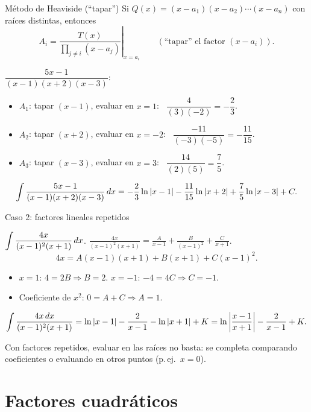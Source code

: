 \documentclass[10pt,aspectratio=169]{beamer}
\begin{document}
\begin{frame}{Método de Heaviside (``tapar'')}
  Si $Q(x)=(x-a_1)(x-a_2)\cdots(x-a_n)$ con raíces distintas, entonces
  \[ A_i=\left.\frac{T(x)}{\prod_{j\ne i}(x-a_j)}\right|_{x=a_i}\qquad(\text{``tapar'' el factor }(x-a_i)). \]
  \begin{ejemplo}[4]
    $\dfrac{5x-1}{(x-1)(x+2)(x-3)}$:
    \begin{itemize}
      \item $A_1$: tapar $(x-1)$, evaluar en $x=1$: \ $\dfrac{4}{(3)(-2)}=-\dfrac23$.
      \item $A_2$: tapar $(x+2)$, evaluar en $x=-2$: \ $\dfrac{-11}{(-3)(-5)}=-\dfrac{11}{15}$.
      \item $A_3$: tapar $(x-3)$, evaluar en $x=3$: \ $\dfrac{14}{(2)(5)}=\dfrac75$.
    \end{itemize}
    \[ \int\frac{5x-1}{(x-1)(x+2)(x-3)}\,dx=-\frac23\ln|x-1|-\frac{11}{15}\ln|x+2|+\frac75\ln|x-3|+C. \]
  \end{ejemplo}
\end{frame}

\begin{frame}{Caso 2: factores lineales repetidos}
  \begin{ejemplo}[5]
    $\displaystyle\int\frac{4x}{(x-1)^2(x+1)}\,dx$. \qquad
    $\displaystyle\frac{4x}{(x-1)^2(x+1)}=\frac A{x-1}+\frac B{(x-1)^2}+\frac C{x+1}$.
    \[ 4x=A(x-1)(x+1)+B(x+1)+C(x-1)^2. \]
    \begin{itemize}
      \item $x=1$: $4=2B\Rightarrow B=2$. \quad $x=-1$: $-4=4C\Rightarrow C=-1$.
      \item Coeficiente de $x^2$: $0=A+C\Rightarrow A=1$.
    \end{itemize}
    \[ \int\frac{4x\,dx}{(x-1)^2(x+1)}=\ln|x-1|-\frac{2}{x-1}-\ln|x+1|+K=\ln\left|\frac{x-1}{x+1}\right|-\frac2{x-1}+K. \]
  \end{ejemplo}
  \begin{observacion}
    Con factores repetidos, evaluar en las raíces no basta: se completa comparando coeficientes o evaluando en otros puntos
    (p.\,ej.\ $x=0$).
  \end{observacion}
\end{frame}

\section{Factores cuadráticos}
\end{document}
